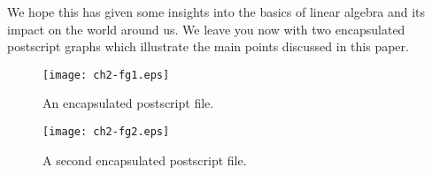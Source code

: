 We hope this has given some insights into the basics of linear
algebra and its impact on the world around us.  We leave you now
with two encapsulated postscript graphs which illustrate the
main points discussed in this paper.


\begin{figure}[h]   %
\begin{center}
\texttt{[image: ch2-fg1.eps]}
\caption{An encapsulated postscript file.}
\end{center}
\end{figure}


%
%


\begin{figure}[h]   %
\begin{center}
\texttt{[image: ch2-fg2.eps]}
\caption{A second encapsulated postscript file.}
\end{center}
\end{figure}

